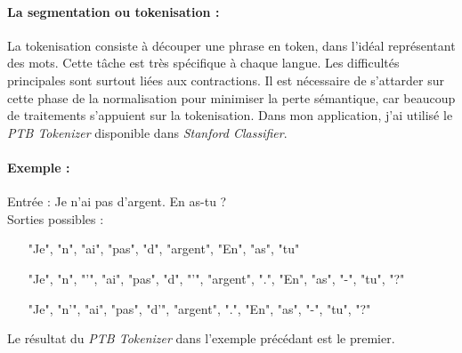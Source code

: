                 \paragraph{La segmentation ou tokenisation :}
                    La tokenisation consiste à découper une phrase en token, dans l'idéal représentant des mots. Cette tâche est très spécifique à chaque langue. Les difficultés principales sont surtout liées aux contractions. Il est nécessaire de s'attarder sur cette phase de la normalisation pour minimiser la perte sémantique, car beaucoup de traitements s'appuient sur la tokenisation. Dans mon application, j'ai utilisé le \textit{PTB Tokenizer} disponible dans \textit{Stanford Classifier}.

                    \paragraph{Exemple :}
                    Entrée : \og Je n'ai pas d'argent. En as-tu ? \fg\\
                    Sorties possibles :
                    \begin{itemize}
                        \item ["Je", "n", "ai", "pas", "d", "argent", "En", "as", "tu"]
                        \item ["Je", "n", "'", "ai", "pas", "d", "'", "argent", ".", "En", "as", "-", "tu", "?"]
                        \item ["Je", "n'", "ai", "pas", "d'", "argent", ".", "En", "as", "-", "tu", "?"]
                    \end{itemize}
                    Le résultat du \textit{PTB Tokenizer} dans l'exemple précédant est le premier.

